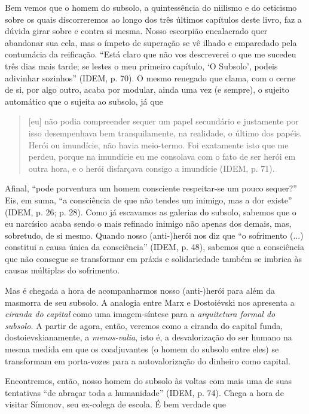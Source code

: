 Bem vemos que o homem do subsolo, a quintessência do niilismo e do
ceticismo sobre os quais discorreremos ao longo dos três últimos
capítulos deste livro, faz a dúvida girar sobre e contra si mesma. Nosso
escorpião encalacrado quer abandonar sua cela, mas o ímpeto de superação
se vê ilhado e emparedado pela contumácia da reificação. ``Está claro
que não vos descreverei o que me sucedeu três dias mais tarde; se lestes
o meu primeiro capítulo, `O Subsolo', podeis adivinhar sozinhos'' (IDEM,
p. 70). O mesmo renegado que clama, com o cerne de si, por algo outro,
acaba por modular, ainda uma vez (e sempre), o sujeito automático que o
sujeita ao subsolo, já que

\begin{quote}
{[}eu{]} não podia compreender sequer um papel secundário e justamente
por isso desempenhava bem tranquilamente, na realidade, o último dos
papéis. Herói ou imundície, não havia meio-termo. Foi exatamente isto
que me perdeu, porque na imundície eu me consolava com o fato de ser
herói em outra hora, e o herói disfarçava consigo a imundície (IDEM, p.
71).
\end{quote}

Afinal, ``pode porventura um homem consciente respeitar-se um pouco
sequer?'' Eis, em suma, ``a consciência de que não tendes um inimigo,
mas a dor existe'' (IDEM, p. 26; p. 28). Como já escavamos as galerias
do subsolo, sabemos que o eu narcísico acaba sendo o mais refinado
inimigo não apenas dos demais, mas, sobretudo, de si mesmo. Quando nosso
(anti-)herói nos diz que ``o sofrimento (...) constitui a causa única da
consciência'' (IDEM, p. 48), sabemos que a consciência que não consegue
se transformar em práxis e solidariedade também se imbrica às causas
múltiplas do sofrimento.

Mas é chegada a hora de acompanharmos nosso (anti-)herói para além da
masmorra de seu subsolo. A analogia entre Marx e Dostoiévski nos
apresenta a \emph{ciranda do capital} como uma imagem-síntese para a
\emph{arquitetura formal do subsolo.} A partir de agora, então, veremos
como a ciranda do capital funda, dostoievskianamente, a
\emph{menos-valia}, isto é, a desvalorização do ser humano na mesma
medida em que os coadjuvantes (o homem do subsolo entre eles) se
transformam em porta-vozes para a autovalorização do dinheiro como
capital.

Encontremos, então, nosso homem do subsolo às voltas com mais uma de
suas tentativas ``de abraçar toda a humanidade'' (IDEM, p. 74). Chega a
hora de visitar Símonov, seu ex-colega de escola. É bem verdade que


